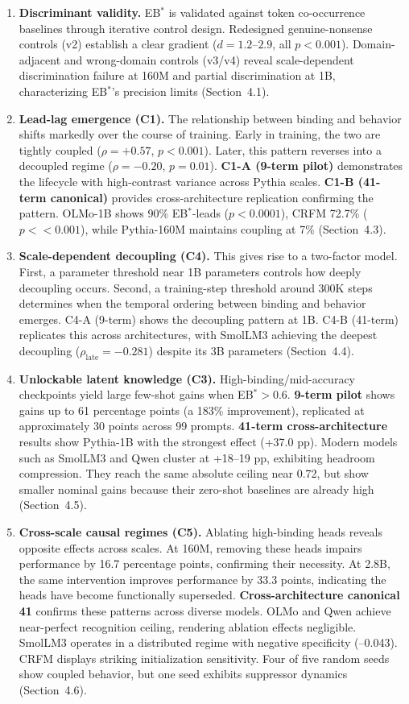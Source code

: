 \documentclass[10pt]{article} %
\begin{document}
\begin{enumerate}
  \item \textbf{Discriminant validity.} EB$^*$ is validated against token co-occurrence baselines through iterative control design. Redesigned genuine-nonsense controls (v2) establish a clear gradient ($d=1.2$--$2.9$, all $p<0.001$). Domain-adjacent and wrong-domain controls (v3/v4) reveal scale-dependent discrimination failure at 160M and partial discrimination at 1B, characterizing EB$^*$'s precision limits (Section~4.1).
  \item \textbf{Lead-lag emergence (C1).} The relationship between binding and behavior shifts markedly over the course of training. Early in training, the two are tightly coupled ($\rho=+0.57$, $p<0.001$). Later, this pattern reverses into a decoupled regime ($\rho=-0.20$, $p=0.01$).
  \textbf{C1-A (9-term pilot)} demonstrates the lifecycle with high-contrast variance across Pythia scales.
  \textbf{C1-B (41-term canonical)} provides cross-architecture replication confirming the pattern. OLMo-1B shows 90\% EB$^*$-leads ($p<0.0001$), CRFM 72.7\% ($p<<0.001$), while Pythia-160M maintains coupling at 7\% (Section~4.3).
  \item \textbf{Scale-dependent decoupling (C4).} This gives rise to a two-factor model. First, a parameter threshold near 1B parameters controls how deeply decoupling occurs. Second, a training-step threshold around 300K steps determines when the temporal ordering between binding and behavior emerges.
  C4-A (9-term) shows the decoupling pattern at 1B. C4-B (41-term) replicates this across architectures, with SmolLM3 achieving the deepest decoupling ($\rho_\text{late}=-0.281$) despite its 3B parameters (Section~4.4).
  \item \textbf{Unlockable latent knowledge (C3).} High-binding/mid-accuracy checkpoints yield large few-shot gains when EB$^*>0.6$.
  \textbf{9-term pilot} shows gains up to 61 percentage points (a 183\% improvement), replicated at approximately 30 points across 99 prompts.
  \textbf{41-term cross-architecture} results show Pythia-1B with the strongest effect (+37.0 pp). Modern models such as SmolLM3 and Qwen cluster at +18--19 pp, exhibiting headroom compression. They reach the same absolute ceiling near 0.72, but show smaller nominal gains because their zero-shot baselines are already high (Section~4.5).
  \item \textbf{Cross-scale causal regimes (C5).} Ablating high-binding heads reveals opposite effects across scales. At 160M, removing these heads impairs performance by 16.7 percentage points, confirming their necessity. At 2.8B, the same intervention improves performance by 33.3 points, indicating the heads have become functionally superseded.
  \textbf{Cross-architecture canonical 41} confirms these patterns across diverse models. OLMo and Qwen achieve near-perfect recognition ceiling, rendering ablation effects negligible. SmolLM3 operates in a distributed regime with negative specificity (--0.043). CRFM displays striking initialization sensitivity. Four of five random seeds show coupled behavior, but one seed exhibits suppressor dynamics (Section~4.6).
\end{enumerate}
\end{document}
